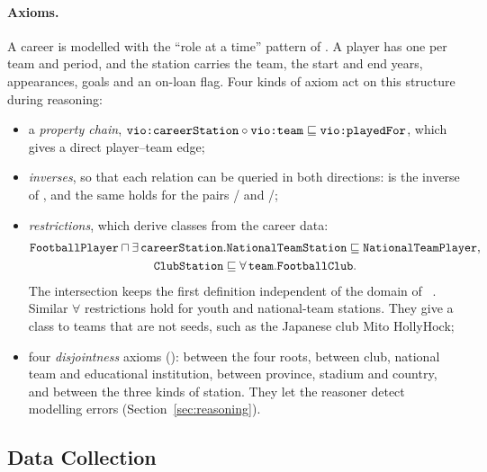 \paragraph{Axioms.} A career is modelled with the ``role at a time'' pattern
of . A player has one  per
team and period, and the station carries the team, the start and end years,
appearances, goals and an on-loan flag. Four kinds of axiom act on this
structure during reasoning:
\begin{itemize}
  \item a \emph{property chain},
        $\term{vio:careerStation} \circ \term{vio:team} \sqsubseteq \term{vio:playedFor}$,
        which gives a direct player--team edge;
  \item \emph{inverses}, so that each relation can be queried in both
        directions:  is the inverse of
        , and the same holds for the pairs
        / and
        /;
  \item \emph{restrictions}, which derive classes from the career data:
        {\small
        \begin{gather*}
          \term{FootballPlayer} \sqcap \exists\,\term{careerStation}.\term{NationalTeamStation} \sqsubseteq \term{NationalTeamPlayer},\\
          \term{ClubStation} \sqsubseteq \forall\,\term{team}.\term{FootballClub}.
        \end{gather*}}
        The intersection keeps the first definition independent of the domain
        of ~\cite{paulheim2024modeling}. Similar $\forall$
        restrictions hold for youth and national-team stations. They give a
        class to teams that are not seeds, such as the Japanese club Mito
        HollyHock;
  \item four \emph{disjointness} axioms (): between
        the four roots, between club, national team and educational
        institution, between province, stadium and country, and between the
        three kinds of station. They let the reasoner detect modelling errors
        (Section~\ref{sec:reasoning}).
\end{itemize}

\subsection{Data Collection}
\label{sec:collection}

